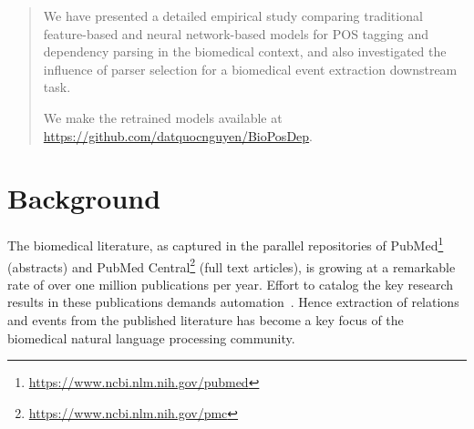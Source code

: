 \documentclass[twocolumn,hyperref]{bmcart}\pdfoutput=1
\begin{document}
\begin{frontmatter}
\begin{fmbox}
\begin{abstractbox}
\begin{abstract}
 We have presented a detailed empirical study comparing   traditional feature-based and neural network-based models for POS tagging and dependency parsing in the biomedical context, and  also investigated the influence of parser selection for a biomedical event extraction downstream task.

 We make the retrained models available at \url{https://github.com/datquocnguyen/BioPosDep}.


\end{abstract}



\begin{keyword}
\end{keyword}



\end{abstractbox}
\end{fmbox}

\end{frontmatter}











\section*{Background}
The biomedical literature, as captured in the parallel  repositories of PubMed\footnote{{\url{https://www.ncbi.nlm.nih.gov/pubmed}}}  (abstracts) and PubMed Central\footnote{{\url{https://www.ncbi.nlm.nih.gov/pmc}}} (full text articles), is growing at a remarkable rate of over one million publications per year. Effort to catalog the key research results in these publications demands  automation~\cite{Baumgartner2007}. Hence extraction of relations and events from the published literature has become a key focus of the biomedical natural language processing community.
\end{document}
